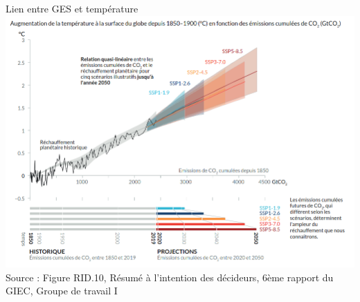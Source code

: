 \documentclass{beamer}
\begin{document}
\begin{frame}{Lien entre GES et température}
\centering
\includegraphics[scale=0.3]{images/Lien_GES_Temperature.png}
\\
\tiny{Source : Figure RID.10, Résumé à l'intention des décideurs,
 6ème rapport du GIEC, Groupe de travail I}
\end{frame}
\end{document}
